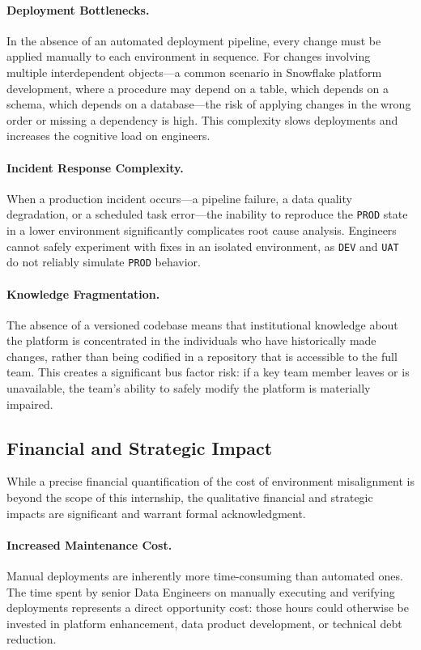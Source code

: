 \paragraph{Deployment Bottlenecks.} In the absence of an automated deployment pipeline, every change must be applied manually to each environment in sequence. For changes involving multiple interdependent objects---a common scenario in Snowflake platform development, where a procedure may depend on a table, which depends on a schema, which depends on a database---the risk of applying changes in the wrong order or missing a dependency is high. This complexity slows deployments and increases the cognitive load on engineers.

\paragraph{Incident Response Complexity.} When a production incident occurs---a pipeline failure, a data quality degradation, or a scheduled task error---the inability to reproduce the \texttt{PROD} state in a lower environment significantly complicates root cause analysis. Engineers cannot safely experiment with fixes in an isolated environment, as \texttt{DEV} and \texttt{UAT} do not reliably simulate \texttt{PROD} behavior.

\paragraph{Knowledge Fragmentation.} The absence of a versioned codebase means that institutional knowledge about the platform is concentrated in the individuals who have historically made changes, rather than being codified in a repository that is accessible to the full team. This creates a significant bus factor risk: if a key team member leaves or is unavailable, the team's ability to safely modify the platform is materially impaired.

\subsection{Financial and Strategic Impact}
\label{subsec:financial-impact}

While a precise financial quantification of the cost of environment misalignment is beyond the scope of this internship, the qualitative financial and strategic impacts are significant and warrant formal acknowledgment.

\paragraph{Increased Maintenance Cost.} Manual deployments are inherently more time-consuming than automated ones. The time spent by senior Data Engineers on manually executing and verifying deployments represents a direct opportunity cost: those hours could otherwise be invested in platform enhancement, data product development, or technical debt reduction.

